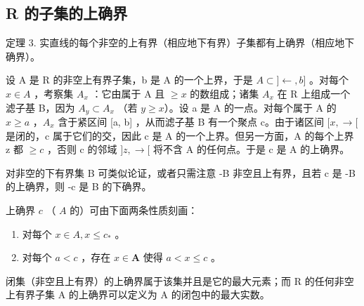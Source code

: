\subsection{R 的子集的上确界}

定理 3. 实直线的每个非空的上有界（相应地下有界）子集都有上确界（相应地下确界）。

设 A 是 R 的非空上有界子集，b 是 A 的一个上界，于是 \(A \subset ] \leftarrow, b]\) 。对每个 \(x \in A\) ，考察集 \(A_x\) ：它由属于 A 且 \(\geqslant x\) 的数组成；诸集 \(A_x\) 在 R 上组成一个滤子基 B，因为 \(A_y \subset A_x\) （若 \(y \geqslant x\)）。设 a 是 A 的一点。对每个属于 A 的 \(x \geqslant a\) ，\(A_x\) 含于紧区间 {[}a, b{]} ，从而滤子基 B 有一个聚点 c。由于诸区间 \([x, \rightarrow[\) 是闭的，c 属于它们的交，因此 c 是 A 的一个上界。但另一方面，A 的每个上界 z 都 \(\geqslant c\) ，否则 c 的邻域 \(]z, \rightarrow[\) 将不含 A 的任何点。于是 c 是 A 的上确界。

对非空的下有界集 B 可类似论证，或者只需注意 -B 非空且上有界，且若 c 是 -B 的上确界，则 -c 是 B 的下确界。

上确界 \(c\) （ \(A\) 的）可由下面两条性质刻画：

\begin{enumerate}
\def\labelenumi{(\roman{enumi})}
\item
  对每个 \(x \in A, x \leqslant c_*\) 。
\item
  对每个 \(a < c\) ，存在 \(x \in \mathbf{A}\) 使得 \(a < x \leqslant c\) 。
\end{enumerate}

闭集（非空且上有界）的上确界属于该集并且是它的最大元素；而 R 的任何非空上有界子集 A 的上确界可以定义为 A 的闭包中的最大实数。

